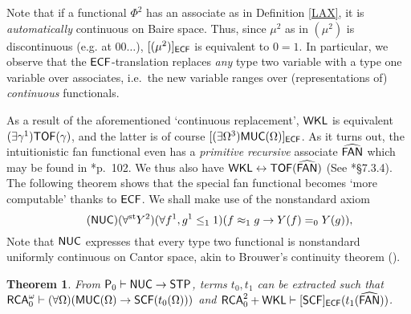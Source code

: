 \documentclass[reqno]{amsart}
\newtheorem{thm}{Theorem}
\newcommand\be{\begin{equation}}
\newcommand\ee{\end{equation}}
\def\STP{\textup{\textsf{STP}}}
\def\RCA{\textup{\textsf{RCA}}}
\def\RCAo{\textup{\textsf{RCA}}_{0}^{\omega}}
\def\WKL{\textup{\textsf{WKL}}}
\def\P{\textup{\textsf{P}}}
\def\FAN{\textup{\textsf{FAN}}}
\def\MUC{\textup{\textsf{MUC}}}
\def\st{\textup{st}}
\def\asa{\leftrightarrow}
\def\di{\rightarrow}
\def\NUC{\textup{\textsf{NUC}}}
\def\TOF{\textup{\textsf{TOF}}}
\def\ECF{\textup{\textsf{ECF}}}
\def\SCF{\textup{\textsf{SCF}}}
\numberwithin{equation}{section}
\numberwithin{thm}{section}
\begin{document}
\medskip

Note that if a functional $\Phi^{2}$ has an associate as in Definition \ref{LAX}, it is \emph{automatically} continuous on Baire space.  
Thus, since $\mu^{2}$ as in $(\mu^{2})$ is discontinuous (e.g. at $00\dots$), $[(\mu^{2})]_{\ECF}$ is equivalent to $0=1$.  
In particular, we observe that the $\ECF$-translation replaces \emph{any} type two variable with a type one variable over associates, i.e.\ the new variable 
ranges over (representations of) \emph{continuous} functionals.  

\medskip

As a result of the aforementioned `continuous replacement', $\WKL$ is equivalent $(\exists \gamma^{1})\TOF(\gamma)$, and the latter is of course $[(\exists \Omega^{3})\MUC(\Omega)]_{\ECF}$.  As it turns out, the intuitionistic fan functional even has a \emph{primitive recursive} associate $\widehat{\FAN}$ which may be found in \cite{noortje}*{p.\ 102}. We thus also have $\WKL\asa \TOF(\widehat{\FAN})$ (See \cite{longmann}*{\S7.3.4}).  
The following theorem shows that the special fan functional becomes `more computable' thanks to $\ECF$.  We shall make use of the nonstandard axiom
\be\tag{$\NUC$}
(\forall^{\st}Y^{2})(\forall f^{1}, g^{1}\leq_{1}1)(f\approx_{1}g\di Y(f)=_{0}Y(g)), 
\ee
Note that $\NUC$ expresses that every type two functional is nonstandard uniformly continuous on Cantor space, akin to Brouwer's continuity theorem (\cite{brouw}).
\begin{thm}\label{koreki} From $\P_{0}\vdash {\NUC}\di \STP$, terms $t_{0}, t_{1}$ can be extracted such that $\RCAo\vdash (\forall \Omega)(\MUC(\Omega)\di \SCF(t_{0}(\Omega)))$ and $\RCA_{0}^{2}+\WKL\vdash [\SCF]_{\ECF}(t_{1}(\widehat{\FAN}))$.
\end{thm}
\end{document}
